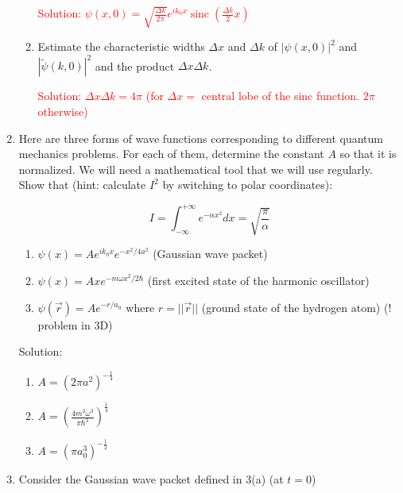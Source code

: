 \documentclass{article}
\begin{document}
\begin{enumerate}
\begin{enumerate}
        \textcolor{red}{Solution: $\psi(x, 0) = \sqrt{\frac{\Delta k}{2 \pi}} e^{i k_{0} x} \operatorname{sinc}\left(\frac{\Delta k}{2} x\right)$}

        \item Estimate the characteristic widths $\Delta x$ and $\Delta k$ of $|\psi(x, 0)|^{2}$ and $|\tilde{\psi}(k, 0)|^{2}$ and the product $\Delta x \Delta k$.

        \textcolor{red}{Solution: $\Delta x \Delta k = 4 \pi$ (for $\Delta x =$ central lobe of the sinc function. $2 \pi$ otherwise)}
    \end{enumerate}

    \item Here are three forms of wave functions corresponding to different quantum mechanics problems. For each of them, determine the constant $A$ so that it is normalized. We will need a mathematical tool that we will use regularly. Show that (hint: calculate $I^{2}$ by switching to polar coordinates):

    $$
    I = \int_{-\infty}^{+\infty} e^{-\alpha x^{2}} dx = \sqrt{\frac{\pi}{\alpha}}
    $$

    \begin{enumerate}
        \item $\psi(x) = A e^{i k_{0} x} e^{-x^{2} / 4 a^{2}}$ (Gaussian wave packet)

        \item $\psi(x) = A x e^{-m \omega x^{2} / 2 \hbar}$ (first excited state of the harmonic oscillator)

        \item $\psi(\vec{r}) = A e^{-r / a_{0}}$ where $r = ||\vec{r}||$ (ground state of the hydrogen atom) (! problem in 3D)

    \end{enumerate}
        {\color{red}Solution:
        \begin{enumerate}
            \item $A = \left(2 \pi a^{2}\right)^{-\frac{1}{4}}$

            \item $A = \left(\frac{4 m^{3} \omega^{3}}{\pi \hbar^{3}}\right)^{\frac{1}{4}}$

            \item $A = \left(\pi a_{0}^{3}\right)^{-\frac{1}{2}}$
        \end{enumerate}}

    \item Consider the Gaussian wave packet defined in 3(a) (at $t=0$)


\end{enumerate}
\end{document}
